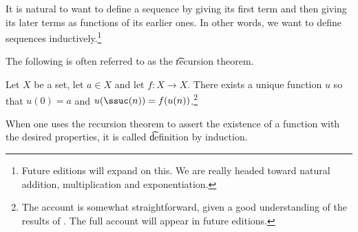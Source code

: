 

It is natural to want to define a sequence by giving its first term and then giving its later terms as functions of its earlier ones.
In other words, we want to define sequences inductively.\footnote{Future editions will expand on this. We are really headed toward natural addition, multiplication and exponentiation.}


The following is often referred to as the \t{recursion theorem}.

\begin{proposition}
Let $X$ be a set, let $a \in X$ and let $f: X \to X$.
  There exists a unique function $u$ so that $u(0) = a$ and $u(\ssuc(n)) = f(u(n))$.\footnote{The account is somewhat straightforward, given a good understanding of the results of . The full account will appear in future editions.}
\end{proposition}

When one uses the recursion theorem to assert the existence of a function with the desired properties, it is called \t{definition by induction}.

\blankpage
